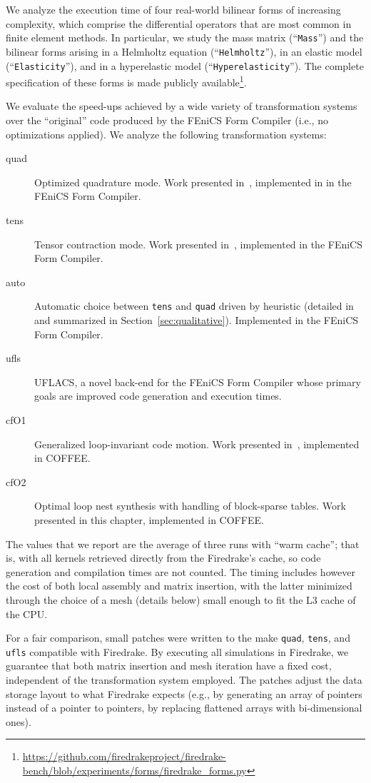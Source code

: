 We analyze the execution time of four real-world bilinear forms of increasing complexity, which comprise the differential operators that are most common in finite element methods. In particular, we study the mass matrix (``\texttt{Mass}'') and the bilinear forms arising in a Helmholtz equation (``\texttt{Helmholtz}''), in an elastic model (``\texttt{Elasticity}''), and in a hyperelastic model (``\texttt{Hyperelasticity}''). The complete specification of these forms is made publicly available\footnote{\url{https://github.com/firedrakeproject/firedrake-bench/blob/experiments/forms/firedrake_forms.py}}. 

We evaluate the speed-ups achieved by a wide variety of transformation systems over the ``original'' code produced by the FEniCS Form Compiler (i.e., no optimizations applied). We analyze the following transformation systems:
\begin{description}
\item[quad] Optimized quadrature mode. Work presented in~\cite{quadrature-olegaard}, implemented in  in the FEniCS Form Compiler. 
\item[tens] Tensor contraction mode. Work presented in~\cite{FFC-TC}, implemented in the FEniCS Form Compiler.
\item[auto] Automatic choice between \texttt{tens} and \texttt{quad} driven by heuristic (detailed in~\cite{Fenics} and summarized in Section~\ref{sec:qualitative}). Implemented in the FEniCS Form Compiler.
\item[ufls] UFLACS, a novel back-end for the FEniCS Form Compiler whose primary goals are improved code generation and execution times.
\item[cfO1] Generalized loop-invariant code motion. Work presented in~\cite{Luporini}, implemented in COFFEE.
\item[cfO2] Optimal loop nest synthesis with handling of block-sparse tables. Work presented in this chapter, implemented in COFFEE.
\end{description}

The values that we report are the average of three runs with ``warm cache''; that is, with all kernels retrieved directly from the Firedrake's cache, so code generation and compilation times are not counted. The timing includes however the cost of both local assembly and matrix insertion, with the latter minimized through the choice of a mesh (details below) small enough to fit the L3 cache of the CPU. 

For a fair comparison, small patches were written to the make \texttt{quad}, \texttt{tens}, and \texttt{ufls} compatible with Firedrake. By executing all simulations in Firedrake, we guarantee that both matrix insertion and mesh iteration have a fixed cost, independent of the transformation system employed. The patches adjust the data storage layout to what Firedrake expects (e.g., by generating an array of pointers instead of a pointer to pointers, by replacing flattened arrays with bi-dimensional ones). 

